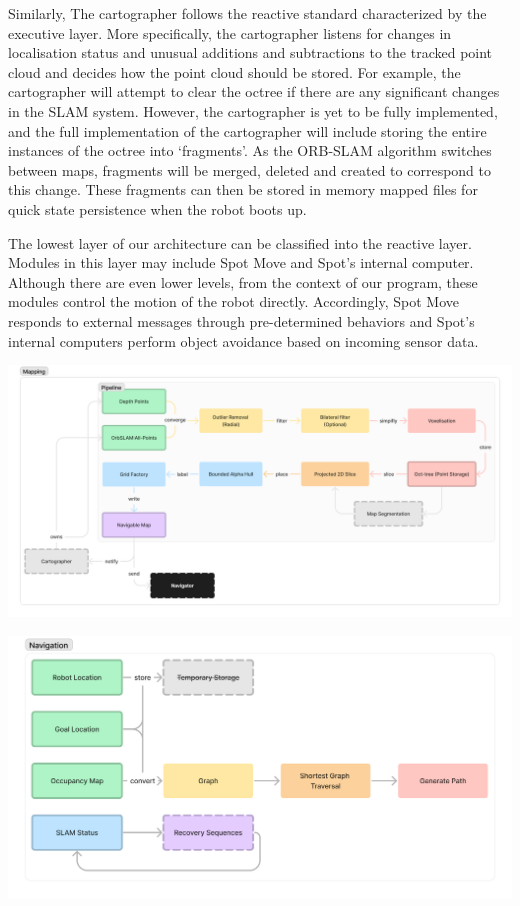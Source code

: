 \documentclass[10pt,english]{article}
\begin{document}
Similarly, The cartographer follows the reactive standard characterized by the executive layer. More specifically, the cartographer listens for changes in localisation status and unusual additions and subtractions to the tracked point cloud and decides how the point cloud should be stored. For example, the cartographer will attempt to clear the octree if there are any significant changes in the SLAM system. However, the cartographer is yet to be fully implemented, and the full implementation of the cartographer will include storing the entire instances of the octree into `fragments'. As the ORB-SLAM algorithm switches between maps, fragments will be merged, deleted and created to correspond to this change. These fragments can then be stored in memory mapped files for quick state persistence when the robot boots up.

The lowest layer of our architecture can be classified into the reactive layer. Modules in this layer may include Spot Move and Spot's internal computer. Although there are even lower levels, from the context of our program, these modules control the motion of the robot directly. Accordingly, Spot Move responds to external messages through pre-determined behaviors and Spot's internal computers perform object avoidance based on incoming sensor data.

\begin{center}
    \includegraphics[width=\textwidth]{images/Mapping.png}
\end{center}

\begin{center}
    \includegraphics[width=\textwidth]{images/Navigation.png}
\end{center}
\end{document}
